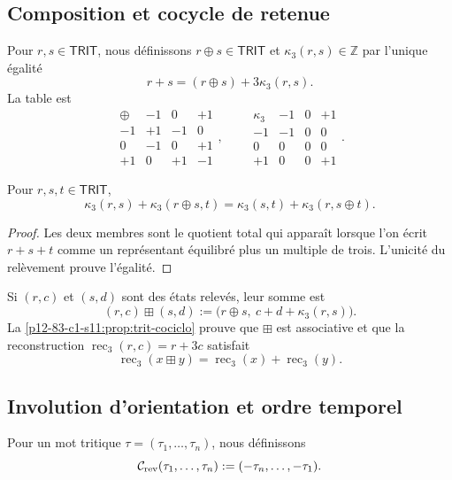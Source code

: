 \subsection{Composition et cocycle de retenue}

Pour \(r,s\in\mathsf{TRIT}\), nous définissons \(r\oplus s\in\mathsf{TRIT}\) et
\(\kappa_3(r,s)\in\mathbb Z\) par l’unique égalité
\[
 r+s=(r\oplus s)+3\kappa_3(r,s).
\]
La table est
\[
\begin{array}{c|ccc}
\oplus&-1&0&+1\\\hline
-1&+1&-1&0\\
0&-1&0&+1\\
+1&0&+1&-1
\end{array},
\qquad
\begin{array}{c|ccc}
\kappa_3&-1&0&+1\\\hline
-1&-1&0&0\\
0&0&0&0\\
+1&0&0&+1
\end{array}.
\]

\begin{proposition}
\label{p12-83-c1-s11:prop:trit-cociclo}
Pour \(r,s,t\in\mathsf{TRIT}\),
\[
 \kappa_3(r,s)+\kappa_3(r\oplus s,t)
 =\kappa_3(s,t)+\kappa_3(r,s\oplus t).
\]
\end{proposition}

\begin{proof}
Les deux membres sont le quotient total qui apparaît lorsque l’on écrit
\(r+s+t\) comme un représentant équilibré plus un multiple de trois.
L’unicité du relèvement prouve l’égalité.
\end{proof}

Si \((r,c)\) et \((s,d)\) sont des états relevés, leur somme est
\[
 (r,c)\boxplus(s,d)
 :=\bigl(r\oplus s,\ c+d+\kappa_3(r,s)\bigr).
\]
La \cref{p12-83-c1-s11:prop:trit-cociclo} prouve que \(\boxplus\) est associative et que la
reconstruction \(\operatorname{rec}_3(r,c)=r+3c\) satisfait
\[
 \operatorname{rec}_3(x\boxplus y)
 =\operatorname{rec}_3(x)+\operatorname{rec}_3(y).
\]

\subsection{Involution d’orientation et ordre temporel}

Pour un mot tritique \(\tau=(\tau_1,\ldots,\tau_n)\), nous définissons
\[
 \mathcal C_{\rm rev}(\tau_1,\ldots,\tau_n)
 :=(-\tau_n,\ldots,-\tau_1).
\]

